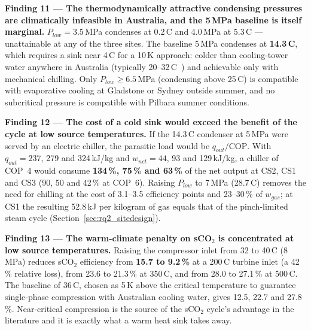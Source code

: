 \documentclass[12pt,a4paper]{report}
\newcommand{\keyresult}[1]{\textbf{\color{resultgreen}#1}}
\begin{document}
\begin{findingbox}
\textbf{Finding 11 --- The thermodynamically attractive condensing pressures
are climatically infeasible in Australia, and the 5\,MPa baseline is itself
marginal.}
$P_{low} = 3.5$\,MPa condenses at 0.2\,\textdegree C and 4.0\,MPa at
5.3\,\textdegree C --- unattainable at any of the three sites. The baseline
5\,MPa condenses at \keyresult{14.3\,\textdegree C}, which requires a sink
near 4\,\textdegree C for a 10\,K approach: colder than cooling-tower water
anywhere in Australia (typically 20--32\,\textdegree C~\cite{BOM2024}) and
achievable only with mechanical chilling. Only $P_{low} \ge 6.5$\,MPa
(condensing above 25\,\textdegree C) is compatible with evaporative cooling
at Gladstone or Sydney outside summer, and no subcritical pressure is
compatible with Pilbara summer conditions.
\end{findingbox}

\begin{findingbox}
\textbf{Finding 12 --- The cost of a cold sink would exceed the benefit of
the cycle at low source temperatures.}
If the 14.3\,\textdegree C condenser at 5\,MPa were served by an electric
chiller, the parasitic load would be $q_{out}/\mathrm{COP}$. With
$q_{out} = 237$, 279 and 324\,kJ/kg and $w_{net} = 44$, 93 and 129\,kJ/kg,
a chiller of COP~4 would consume \keyresult{134\,\%, 75\,\% and 63\,\%} of
the net output at CS2, CS1 and CS3 (90, 50 and 42\,\% at COP~6). Raising
$P_{low}$ to 7\,MPa (28.7\,\textdegree C) removes the need for chilling at
the cost of 3.1--3.5 efficiency points and 23--30\,\% of $w_{gas}$; at CS1
the resulting 52.8\,kJ per kilogram of gas equals that of the pinch-limited
steam cycle (Section~\ref{sec:rq2_sitedesign}).
\end{findingbox}

\begin{findingbox}
\textbf{Finding 13 --- The warm-climate penalty on sCO$_2$ is concentrated at
low source temperatures.}
Raising the compressor inlet from 32 to 40\,\textdegree C (8\,MPa) reduces
sCO$_2$ efficiency from \keyresult{15.7 to 9.2\,\%} at a 200\,\textdegree C
turbine inlet (a 42\,\% relative loss), from 23.6 to 21.3\,\% at
350\,\textdegree C, and from 28.0 to 27.1\,\% at 500\,\textdegree C. The
baseline of 36\,\textdegree C, chosen as 5\,K above the critical temperature
to guarantee single-phase compression with Australian cooling water, gives
12.5, 22.7 and 27.8\,\%. Near-critical compression is the source of the
sCO$_2$ cycle's advantage in the literature and it is exactly what a warm heat
sink takes away.
\end{findingbox}
\end{document}
